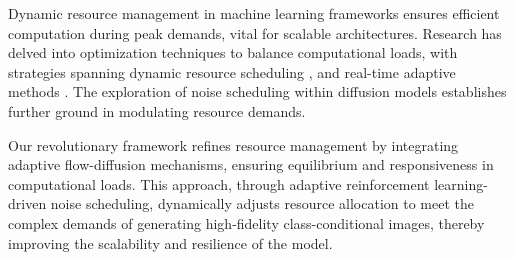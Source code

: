 Dynamic resource management in machine learning frameworks ensures efficient computation during peak demands, vital for scalable architectures. Research has delved into optimization techniques to balance computational loads, with strategies spanning dynamic resource scheduling \cite{bertsimas2011theory}, and real-time adaptive methods \cite{gregor2015draw, paszke2019pytorch}. The exploration of noise scheduling within diffusion models \cite{vincent2011connection} establishes further ground in modulating resource demands.

Our revolutionary framework refines resource management by integrating adaptive flow-diffusion mechanisms, ensuring equilibrium and responsiveness in computational loads. This approach, through adaptive reinforcement learning-driven noise scheduling, dynamically adjusts resource allocation to meet the complex demands of generating high-fidelity class-conditional images, thereby improving the scalability and resilience of the model.


